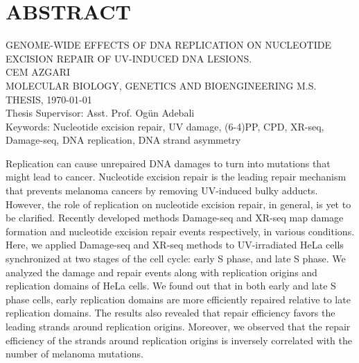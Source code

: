 \setcounter{page}{3}
\chapter*{\vspace{-4\baselineskip} \bf ABSTRACT} 

\begin{center}
\MakeUppercase{GENOME-WIDE EFFECTS OF DNA REPLICATION ON
NUCLEOTIDE EXCISION REPAIR OF UV-INDUCED
DNA LESIONS.} \\[3\baselineskip]
\MakeUppercase{Cem Azgari} \\[\baselineskip]
MOLECULAR BIOLOGY, GENETICS AND BIOENGINEERING M.S. THESIS, \Cemdateformat\today \\[\baselineskip]
Thesis Supervisor: Asst. Prof. Ogün Adebali \\[2\baselineskip]
Keywords: Nucleotide excision repair, UV damage, (6-4)PP, CPD, XR-seq, Damage-seq, DNA replication, DNA strand asymmetry \\[2\baselineskip]
\end{center}

\singlespacing
Replication can cause unrepaired DNA damages to turn into mutations that might lead to cancer. Nucleotide excision repair is the leading repair mechanism that prevents melanoma cancers by removing UV-induced bulky adducts. However, the role of replication on nucleotide excision repair, in general, is yet to be clarified. Recently developed methods Damage-seq and XR-seq map damage formation and nucleotide excision repair events respectively, in various conditions. Here, we applied Damage-seq and XR-seq methods to UV-irradiated HeLa cells synchronized at two stages of the cell cycle: early S phase, and late S phase. We analyzed the damage and repair events along with replication origins and replication domains of HeLa cells. We found out that in both early and late S phase cells, early replication domains are more efficiently repaired relative to late replication domains. The results also revealed that repair efficiency favors the leading strands around replication origins. Moreover, we observed that the repair efficiency of the strands around replication origins is inversely correlated with the number of melanoma mutations.

\clearpage\pagebreak
\onehalfspacing
